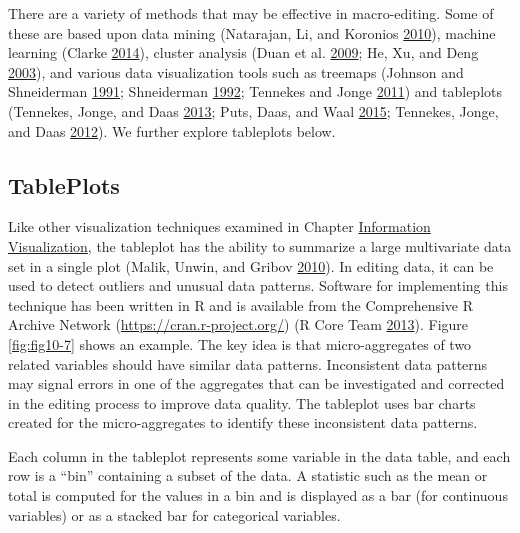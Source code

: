 \documentclass[]{krantz}
\begin{document}
There are a variety of methods that may be effective in macro-editing.
Some of these are based upon data mining (Natarajan, Li, and Koronios
\protect\hyperlink{ref-natarajan2010data}{2010}), machine learning
(Clarke \protect\hyperlink{ref-Clarke2014}{2014}), cluster analysis
(Duan et al. \protect\hyperlink{ref-duan2009cluster}{2009}; He, Xu, and
Deng \protect\hyperlink{ref-he2003discovering}{2003}), and various data
visualization tools such as treemaps (Johnson and Shneiderman
\protect\hyperlink{ref-johnson1991tree}{1991}; Shneiderman
\protect\hyperlink{ref-shneiderman1992tree}{1992}; Tennekes and Jonge
\protect\hyperlink{ref-tennekes2011top}{2011}) and tableplots (Tennekes,
Jonge, and Daas \protect\hyperlink{ref-tennekes2013visualizing}{2013};
Puts, Daas, and Waal \protect\hyperlink{ref-puts2015finding}{2015};
Tennekes, Jonge, and Daas \protect\hyperlink{ref-Tennekes2012}{2012}).
We further explore tableplots below.

\subsection{TablePlots}\label{tableplots}

Like other visualization techniques examined in Chapter
\protect\hyperlink{chap:viz}{Information Visualization}, the tableplot
has the ability to summarize a large multivariate data set in a single
plot (Malik, Unwin, and Gribov
\protect\hyperlink{ref-malik2010interactive}{2010}). In editing data, it
can be used to detect outliers and unusual data patterns. Software for
implementing this technique has been written in R and is available from
the Comprehensive R Archive Network (\url{https://cran.r-project.org/})
(R Core Team \protect\hyperlink{ref-cran2013}{2013}). Figure
\ref{fig:fig10-7} shows an example. The key idea is that
micro-aggregates of two related variables should have similar data
patterns. Inconsistent data patterns may signal errors in one of the
aggregates that can be investigated and corrected in the editing process
to improve data quality. The tableplot uses bar charts created for the
micro-aggregates to identify these inconsistent data patterns.

Each column in the tableplot represents some variable in the data table,
and each row is a ``bin'' containing a subset of the data. A statistic
such as the mean or total is computed for the values in a bin and is
displayed as a bar (for continuous variables) or as a stacked bar for
categorical variables.
\end{document}
